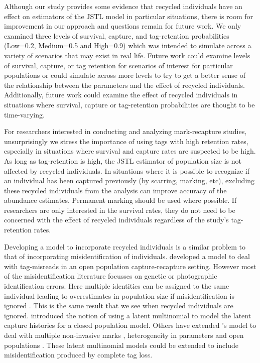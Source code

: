 \documentclass[12pt]{article}
\begin{document}
Although our study provides some evidence that recycled individuals have
an effect on estimators of the JSTL model in particular situations,
there is room for improvement in our approach and questions remain for
future work. We only examined three levels of survival, capture, and
tag-retention probabilities (Low=0.2, Medium=0.5 and High=0.9) which was
intended to simulate across a variety of scenarios that may exist
in real life. Future work could examine levels of survival, capture, or
tag retention for scenarios of interest for particular populations or
could simulate across more levels to try to get a better sense of the
relationship between the parameters and the effect of recycled
individuals. Additionally, future work could examine the effect of
recycled individuals in situations where survival, capture or
tag-retention probabilities are thought to be time-varying.

For researchers interested in conducting and analyzing mark-recapture
studies, unsurprisingly we stress the importance of using tags with high retention
rates, especially in situations where survival and capture rates are
suspected to be high. As long as tag-retention is high, the JSTL
estimator of population size is not affected by recycled individuals. In
situations where it is possible to recognize if an individual has been
captured previously (by scarring, marking, etc), excluding these
recycled individuals from the analysis can improve accuracy of the
abundance estimates. Permanent marking should be used where possible. If
researchers are only interested in the survival rates, they do not need
to be concerned with the effect of recycled individuals regardless of
the study's tag-retention rates.

Developing a model to incorporate recycled individuals is a similar problem to that of incorporating misidentification of individuals.  \cite{Schwarz:1999} developed a model to deal with tag-misreads in an open population capture-recapture setting.  However most of the misidentification literature focusses on genetic or photographic identification errors.  Here multiple identities can be assigned to the same individual leading to overestimates in population size if misidentification is ignored \citep{Yoshizaki:2011}. This is the same result that we see when recycled individuals are ignored.   \cite{Link:2010} introduced the notion of using a latent multinomial to model the latent capture histories for a closed population model. Others have extended \citeauthor{Link:2010}'s model to deal with multiple non-invasive marks \citep{Bonner:2013, McClintock:2013}, heterogeneity in parameters \citep{Mcclintock:2014} and open populations \citep{Bonner:2013}.  These latent multinomial models could be extended to include misidentification produced by complete tag loss.
\end{document}
